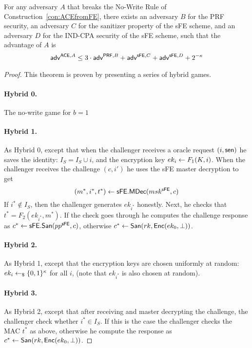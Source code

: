 \documentclass{llncs}
\begin{document}
\begin{thm} \label{thm:ACE_sFE_no_write}
For any adversary $A$ that breaks the No-Write Rule of Construction~\ref{con:ACEfromFE}, there exists an adversary $B$ for the PRF security, an adversary $C$ for the sanitizer property of the sFE scheme, and an adversary $D$ for the IND-CPA security of the sFE scheme, such that the advantage of $A$ is
	\begin{align*}
	\mathsf{adv}^{\mathsf{ACE},A} \leq 3 \cdot \mathsf{adv}^{\mathsf{PRF}, B} + \mathsf{adv}^{\mathsf{sFE},C} + \mathsf{adv}^{\mathsf{sFE},D} + 2^{-\kappa}
	\end{align*}
\end{thm}

\begin{proof}
This theorem is proven by presenting a series of hybrid games.

\paragraph{Hybrid 0.} The no-write game for $b=1$

\paragraph{Hybrid 1.} As Hybrid 0, except that when the challenger receives a oracle request $(i,\mathsf{sen})$ he saves the identity: $I_S = I_S \cup i$, and the encryption key $ek_i \leftarrow F_1(K,i)$. When the challenger receives the challenge $(c,i')$ he uses the sFE master decryption to get 
$$ (m^*,i^*,t^*) \leftarrow \mathsf{sFE}.\mathsf{MDec}(msk^{\mathsf{sFE}},c)$$
If $i^* \notin I_S$, then the challenger generates $ek_{i^*}$ honestly.
Next, he checks that $t^* = F_{2}(ek_{i^*},m^*)$. If the check goes through he computes the challenge response as $c^* \leftarrow \mathsf{sFE}.\mathsf{San}(pp^{\mathsf{sFE}},c)$, otherwise $c^* \leftarrow \mathsf{San}(rk,\mathsf{Enc}(ek_0,\bot))$.

\paragraph{Hybrid 2.} As Hybrid 1, except that the encryption keys are chosen uniformly at random: $ek_i \leftarrow_\$ \{0,1\}^\kappa$ for all $i$, (note that $ek_{i^*}$ is also chosen at random).

\paragraph{Hybrid 3.} As Hybrid 2, except that after receiving and master decrypting the challenge, the challenger check whether $i^* \in I_S$. If this is the case the challenger checks the MAC $t^*$ as above, otherwise he compute the response as  $c^* \leftarrow \mathsf{San}(rk,\mathsf{Enc}(ek_0,\bot))$.


\end{proof}
\end{document}
